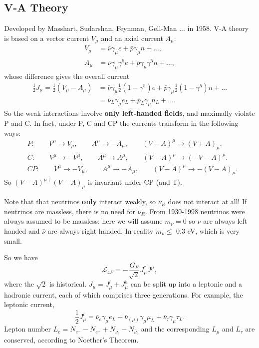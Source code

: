 \documentclass[a4paper,12pt]{article}
\begin{document}
\subsection{V-A Theory}
%
Developed by Masshart, Sudarshan, Feynman, Gell-Man ... in 1958. V-A theory is based on a vector current $V_\mu$ and an axial current $A_\mu$:
\begin{equation}
\begin{split}
V_\mu &= \bar{\nu}\gamma_\mu e + \bar{p}\gamma_\mu n + ... ,\\
A_\mu &= \bar{\nu}\gamma_\mu \gamma^5 e + \bar{p}\gamma_\mu \gamma^5 n + ...,
\end{split}
\end{equation}
whose difference gives the overall current
\begin{equation}
\begin{split}
\frac{1}{2}J_\mu = \frac{1}{2}(V_\mu - A_\mu)  &= \bar{\nu}\gamma_\mu\frac{1}{2}(1-\gamma^5) e + \bar{p}\gamma_\mu\frac{1}{2}(1-\gamma^5) n + ... \\
&= \bar{\nu}_L\gamma_\mu e_L + \bar{p}_L\gamma_\mu n_L + ... .
\end{split}
\end{equation}
So the weak interactions involve \textbf{only left-handed fields}, and maximally violate P and C. In fact, under P, C and CP the currents transform in the following ways:
\begin{equation}
\begin{split}
&P: \qquad V^\mu \to V_\mu, \qquad A^\mu \to -A_\mu, \qquad (V-A)^\mu \to (V+A)_\mu. \\
&C: \qquad V^\mu \to -V^\mu, \qquad A^\mu \to A^\mu, \qquad (V-A)^\mu \to (-V-A)^\mu. \\
&CP: \qquad V^\mu \to -V_\mu, \qquad A^\mu \to -A_\mu, \qquad (V-A)^\mu \to -(V-A)_\mu. 
\end{split}
\end{equation}
So $(V-A)^{\mu \dagger}(V-A)_\mu$ is invariant under CP (and T). 

Note that that neutrinos \textbf{only} interact weakly, so $\nu_R$ does not interact at all! If neutrinos are massless, there is no need for $\nu_R$. From 1930-1998 neutrinos were always assumed to be massless: here we will assume $m_\nu=0$ so $\nu$ are always left handed and $\bar{\nu}$ are always right handed. In reality $m_\nu \leq$ 0.3 eV, which is very small.

So we have
%
\begin{equation}
\mathcal{L}_{4F} = -\frac{G_F}{\sqrt{2}} J_\mu^\dagger J^\mu,
\end{equation}
where the $\sqrt{2}$ is historical. $J_\mu = J_\mu^l + J_\mu^h$ can be split up into a leptonic and a hadronic current, each of which comprises three generations. For example, the leptonic current,
\begin{equation}
\frac{1}{2}J_\mu^l = \bar{\nu}_e\gamma_\mu e_L + \bar{\nu}_{(\mu)}\gamma_\mu \mu_L + \bar{\nu}_\tau \gamma_\mu \tau_L.
\end{equation}
Lepton number $L_e = N_{e^-} - N_{e^+} + N_{\nu_e} - N_{\bar{\nu}_e}$ and the corresponding $L_\mu$ and $L_\tau$ are conserved, according to Noether's Theorem.  
\end{document}
